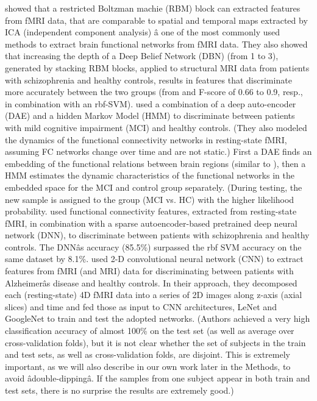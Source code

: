 \documentclass{article}
\begin{document}
\citet{Plis2014} showed that a restricted Boltzman machie (RBM) block \citep{Hinton2002} can extracted features from fMRI data, that are comparable to spatial and temporal maps extracted by ICA (independent component analysis) â one of the most commonly used methods to extract brain functional networks from fMRI data. They also showed that increasing the depth of a Deep Belief Network (DBN) \citep{Hinton2006} (from 1 to 3), generated by stacking RBM blocks, applied to structural MRI data from patients with schizophrenia and healthy controls, results in features that discriminate more accurately between the two groups (from and F-score of 0.66 to 0.9, resp., in combination with an rbf-SVM).
\citet{Suk2016} used a combination of a deep auto-encoder (DAE) and a hidden Markov Model (HMM) to discriminate between patients with mild cognitive impairment (MCI) and healthy controls. (They also modeled the dynamics of the functional connectivity networks in resting-state fMRI, assuming FC networks change over time and are not static.) First a DAE finds an embedding of the functional relations between brain regions (similar to \citep{Plis2014}), then a HMM estimates the dynamic characteristics of the functional networks in the embedded space for the MCI and control group separately. (During testing, the new sample is assigned to the group (MCI vs. HC) with the higher likelihood probability. \citet{Kim2016} used functional connectivity features, extracted from resting-state fMRI, in combination with a sparse autoencoder-based pretrained deep neural network (DNN), to discriminate between patients with schizophrenia and healthy controls. The DNNâs accuracy (85.5\%) surpassed the rbf SVM accuracy on the same dataset by 8.1\%. \citet{Sarraf2016} used 2-D convolutional neural network (CNN) to extract features from fMRI (and MRI) data for discriminating between patients with Alzheimerâs disease and healthy controls. In their approach, they decomposed each (resting-state) 4D fMRI data into a series of 2D images along z-axis (axial slices) and time and fed those as input to CNN architectures, LeNet \citep{Lecun1998} and GoogleNet \citep{Szegedy2015} to train and test the adopted networks. (Authors achieved a very high classification accuracy of almost 100\% on the test set (as well as average over cross-validation folds), but it is not clear whether the set of subjects in the train and test sets, as well as cross-validation folds, are disjoint. This is extremely important, as we will also describe in our own work later in the Methods, to avoid âdouble-dippingâ. If the samples from one subject appear in both train and test sets, there is no surprise the results are extremely good.)
\end{document}
